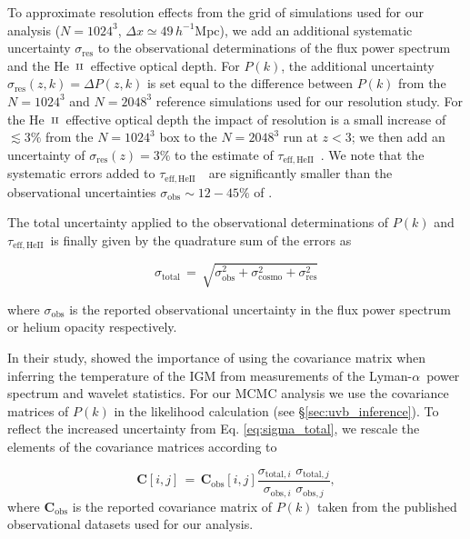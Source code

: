 \documentclass[twocolumn]{aastex62}
\newcommand\Lya{Lyman-$\alpha$}
\def\HeII{\hbox{He~$\scriptstyle\rm II$}}
\newcommand\taueffHe{$\tau_{\mathrm{eff,HeII}}$~}
\begin{document}
To approximate resolution effects 
from the grid of simulations used for our analysis ($N=1024^3$, $\Delta x \simeq 49 \,h^{-1}$Mpc), we add an additional systematic uncertainty 
$\sigma_{\mathrm{res}}$ to the observational determinations of the flux power spectrum and the \HeII\ effective optical depth.
For $P(k)$, the additional uncertainty $\sigma_{\mathrm{res}}(z,k) = \Delta P(z,k)$
is set equal to the difference between $P(k)$ from the $N=1024^3$ and 
$N=2048^3$ reference simulations used for our resolution study.   
For the \HeII\ effective optical depth 
the impact of resolution is a small increase of $\lesssim 3\%$ from the $N=1024^3$ box to the
$N=2048^3$ run at $z<3$; we then add an uncertainty of $\sigma_{\mathrm{res}}(z) = 3\%$ to the estimate of \taueffHe. We note that the systematic errors added to \taueffHe\ are 
significantly smaller than the observational uncertainties    $\sigma_\mathrm{obs} \sim 12 - 45\%$ of \cite{Worseck+2019}.

The total uncertainty applied to the observational determinations of $P(k)$ and \taueffHe is finally given by the quadrature sum of the errors as

\begin{equation}
\sigma_\mathrm{total} \, = \, \sqrt{ \sigma_{\mathrm{obs}}^2 + \sigma_{\mathrm{cosmo}}^2 +  \sigma_{\mathrm{res}}^2 }
\label{eq:sigma_total}
\end{equation} 

\noindent
where $\sigma_{\mathrm{obs}}$ is the reported observational uncertainty in the flux power spectrum or helium opacity respectively.

In their study, \cite{wolfson2021} showed the importance of using the covariance matrix when inferring the
temperature of the IGM from measurements of the \Lya\ power spectrum and wavelet statistics.  
For our MCMC analysis we use the covariance matrices of $P(k)$ 
in the likelihood calculation (see \S\ref{sec:uvb_inference}). 
To reflect the increased uncertainty from Eq. \ref{eq:sigma_total}, we rescale the 
elements of the covariance matrices according to

\begin{equation}
\mathbf{C}[i,j] \, = \, \mathbf{C}_\mathrm{obs}[i,j] \frac{\sigma_{\mathrm{total},i} \,\, \sigma_{\mathrm{total},j}}{\sigma_{\mathrm{obs},i} \,\, \sigma_{\mathrm{obs},j}},
\label{eq:rescaled_covariance}
\end{equation} 
\noindent
where $\mathbf{C}_\mathrm{obs}$ is the reported covariance matrix of $P(k)$ taken from the published observational datasets
used for our analysis.    
\end{document}
